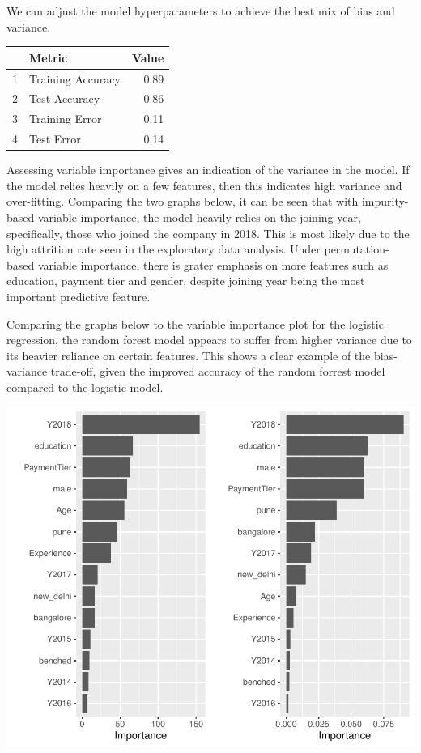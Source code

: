 \documentclass[11pt,preprint, authoryear]{elsarticle}
\let\origtable\table
\let\endorigtable\endtable
\renewenvironment{table}[1][2] {
    \expandafter\origtable\expandafter[H]
} {
    \endorigtable
}
\numberwithin{equation}{section}
\numberwithin{figure}{section}
\numberwithin{table}{section}
\begin{document}
We can adjust the model hyperparameters to achieve the best mix of bias
and variance.

\begin{table}[H]
\centering
\begin{tabular}{rlr}
  \hline
 & Metric & Value \\ 
  \hline
1 & Training Accuracy & 0.89 \\ 
  2 & Test Accuracy & 0.86 \\ 
  3 & Training Error & 0.11 \\ 
  4 & Test Error & 0.14 \\ 
   \hline
\end{tabular}
\caption{More Metrics for Tuned Random Forest \label{tab1}} 
\end{table}

Assessing variable importance gives an indication of the variance in the
model. If the model relies heavily on a few features, then this
indicates high variance and over-fitting. Comparing the two graphs
below, it can be seen that with impurity-based variable importance, the
model heavily relies on the joining year, specifically, those who joined
the company in 2018. This is most likely due to the high attrition rate
seen in the exploratory data analysis. Under permutation-based variable
importance, there is grater emphasis on more features such as education,
payment tier and gender, despite joining year being the most important
predictive feature.

Comparing the graphs below to the variable importance plot for the
logistic regression, the random forest model appears to suffer from
higher variance due to its heavier reliance on certain features. This
shows a clear example of the bias-variance trade-off, given the improved
accuracy of the random forrest model compared to the logistic model.

\includegraphics{Final_project_files/figure-latex/unnamed-chunk-17-1.pdf}
\end{document}
